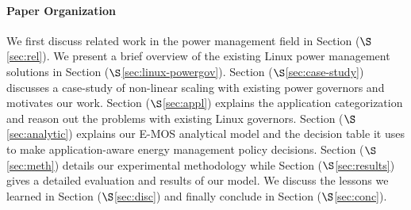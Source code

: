 \paragraph{Paper Organization} 
We first discuss related work in the power management field in Section ($\S$\ref{sec:rel}). 
We present a brief overview of the existing Linux power management solutions in Section ($\S$\ref{sec:linux-powergov}). 
Section ($\S$\ref{sec:case-study}) discusses a case-study of non-linear scaling with existing power governors and motivates our work.
Section ($\S$\ref{sec:appl}) explains the application categorization and reason out the 
problems with existing Linux governors. 
Section ($\S$\ref{sec:analytic}) explains
our E-MOS analytical model and the decision table it uses to make application-aware energy management policy decisions. Section ($\S$\ref{sec:meth}) details our experimental methodology 
while Section ($\S$\ref{sec:results}) gives a detailed evaluation and results of our model. We discuss the
lessons we learned in Section ($\S$\ref{sec:disc}) and finally conclude in Section ($\S$\ref{sec:conc}).

